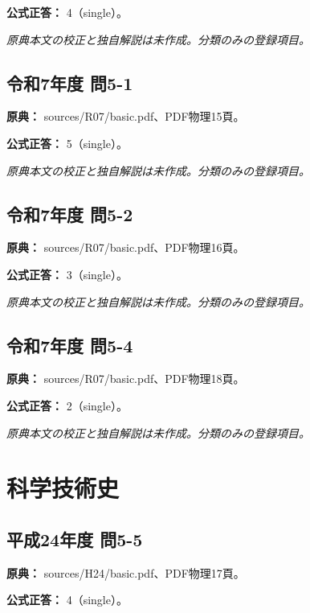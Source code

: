\textbf{公式正答：} 4（single）。

\par\textit{原典本文の校正と独自解説は未作成。分類のみの登録項目。}

\subsection{令和7年度 問5-1}
\label{q:r07-reg-basic-5-1}

\noindent\textbf{原典：} sources/R07/basic.pdf、PDF物理15頁。

\textbf{公式正答：} 5（single）。

\par\textit{原典本文の校正と独自解説は未作成。分類のみの登録項目。}

\subsection{令和7年度 問5-2}
\label{q:r07-reg-basic-5-2}

\noindent\textbf{原典：} sources/R07/basic.pdf、PDF物理16頁。

\textbf{公式正答：} 3（single）。

\par\textit{原典本文の校正と独自解説は未作成。分類のみの登録項目。}

\subsection{令和7年度 問5-4}
\label{q:r07-reg-basic-5-4}

\noindent\textbf{原典：} sources/R07/basic.pdf、PDF物理18頁。

\textbf{公式正答：} 2（single）。

\par\textit{原典本文の校正と独自解説は未作成。分類のみの登録項目。}

\section{科学技術史}

\subsection{平成24年度 問5-5}
\label{q:h24-reg-basic-5-5}

\noindent\textbf{原典：} sources/H24/basic.pdf、PDF物理17頁。

\textbf{公式正答：} 4（single）。


